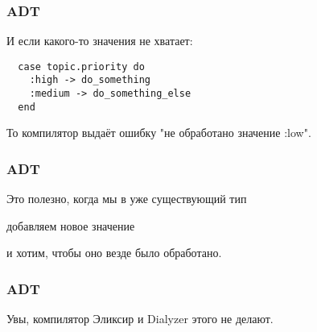 \documentclass[10pt]{beamer}
\begin{document}
\begin{frame}[fragile]
  \frametitle{ADT}
  И если какого-то значения не хватает:
  \par \bigskip
  \begin{lstlisting}
  case topic.priority do
    :high -> do_something
    :medium -> do_something_else
  end
  \end{lstlisting}
  \par \bigskip
  То компилятор выдаёт ошибку "не обработано значение :low".
\end{frame}

\begin{frame}
  \frametitle{ADT}
  Это полезно, когда мы в уже существующий тип
  \par \bigskip
  добавляем новое значение
  \par \bigskip
  и хотим, чтобы оно везде было обработано.
\end{frame}

\begin{frame}
  \frametitle{ADT}
  Увы, компилятор Эликсир и Dialyzer этого не делают.
\end{frame}
\end{document}

